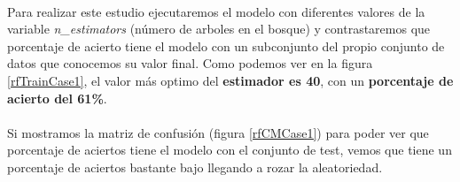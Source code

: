 \paragraph{}
Para realizar este estudio ejecutaremos el modelo con diferentes valores de la variable \textit{n\_estimators}\cite{ref:rf_random_forest_classifier} (número de arboles en el bosque) y contrastaremos que porcentaje de acierto tiene el modelo con un subconjunto del propio conjunto de datos que conocemos su valor final. Como podemos ver en la figura \ref{rfTrainCase1}, el valor más optimo del \textbf{estimador es 40}, con un \textbf{porcentaje de acierto del 61\%}.

\paragraph{}
Si mostramos la matriz de confusión\cite{ref:confusion_matrix} (figura \ref{rfCMCase1}) para poder ver que porcentaje de aciertos tiene el modelo con el conjunto de test, vemos que tiene un porcentaje de aciertos bastante bajo llegando a rozar la aleatoriedad.

